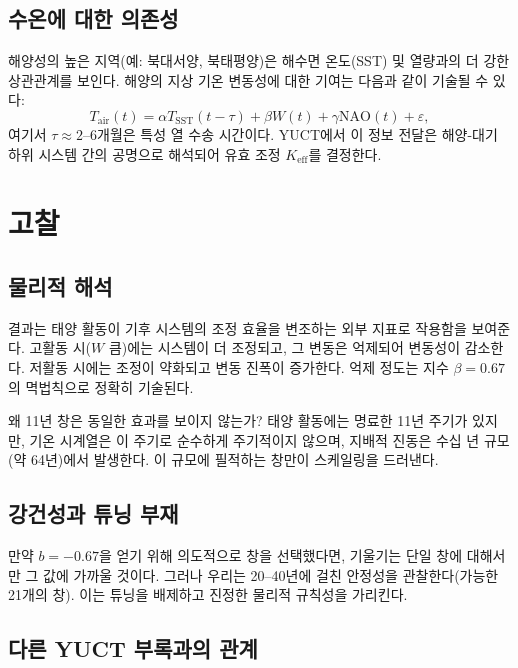 \documentclass[11pt,a4paper]{article}
\newcommand{\Keff}{K_{\mathrm{eff}}}
\newcommand{\be}{\beta}
\begin{document}
	\subsection{수온에 대한 의존성}
	
	해양성의 높은 지역(예: 북대서양, 북태평양)은 해수면 온도(SST) 및 열량과의 더 강한 상관관계를 보인다. 해양의 지상 기온 변동성에 대한 기여는 다음과 같이 기술될 수 있다:
	\[
	T_{\text{air}}(t) = \alpha T_{\text{SST}}(t-\tau) + \beta W(t) + \gamma \text{NAO}(t) + \varepsilon,
	\]
	여기서 $\tau \approx 2$–6개월은 특성 열 수송 시간이다. YUCT에서 이 정보 전달은 해양-대기 하위 시스템 간의 공명으로 해석되어 유효 조정 $\Keff$를 결정한다.
	
	\section{고찰}
	
	\subsection{물리적 해석}
	
	결과는 태양 활동이 기후 시스템의 조정 효율을 변조하는 외부 지표로 작용함을 보여준다. 고활동 시($W$ 큼)에는 시스템이 더 조정되고, 그 변동은 억제되어 변동성이 감소한다. 저활동 시에는 조정이 약화되고 변동 진폭이 증가한다. 억제 정도는 지수 $\be = 0.67$의 멱법칙으로 정확히 기술된다.
	
	왜 11년 창은 동일한 효과를 보이지 않는가? 태양 활동에는 명료한 11년 주기가 있지만, 기온 시계열은 이 주기로 순수하게 주기적이지 않으며, 지배적 진동은 수십 년 규모(약 64년)에서 발생한다. 이 규모에 필적하는 창만이 스케일링을 드러낸다.
	
	\subsection{강건성과 튜닝 부재}
	
	만약 $b = -0.67$을 얻기 위해 의도적으로 창을 선택했다면, 기울기는 단일 창에 대해서만 그 값에 가까울 것이다. 그러나 우리는 20–40년에 걸친 안정성을 관찰한다(가능한 21개의 창). 이는 튜닝을 배제하고 진정한 물리적 규칙성을 가리킨다.
	
	\subsection{다른 YUCT 부록과의 관계}
	
\end{document}

